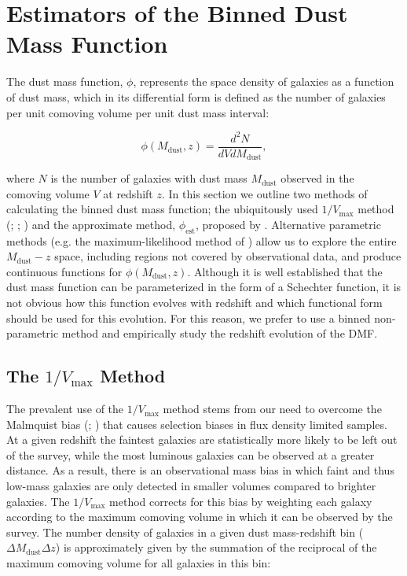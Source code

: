 \section{Estimators of the Binned Dust Mass Function}
\label{sec:dmf_estimators}

The dust mass function, $\phi$, represents the space density of galaxies as a function of dust mass, which in its differential form is defined as the number of galaxies per unit comoving volume per unit dust mass interval:

\begin{equation}
    \phi(M_{\textrm{dust}}, z) = \frac{d^2N}{dV dM_{\textrm{dust}}},
\label{eq:differential_phi}
\end{equation}

\noindent where $N$ is the number of galaxies with dust mass $M_{\textrm{dust}}$ observed in the comoving volume $V$ at redshift $z$. In this section we outline two methods of calculating the binned dust mass function; the ubiquitously used $1/V_{\textrm{max}}$ method (\citealt{Schmidt_1968}; \citealt{Felten_1976}; \citealt{Avni_1980}) and the approximate method, $\phi_{\textrm{est}}$, proposed by \citealt{Page_2000}. Alternative parametric methods (e.g. the maximum-likelihood method of \citealt{Marshall_1983}) allow us to explore the entire $M_{\textrm{dust}} - z$ space, including regions not covered by observational data, and produce continuous functions for $\phi(M_{\textrm{dust}}, z)$. Although it is well established that the dust mass function can be parameterized in the form of a Schechter function, it is not obvious how this function evolves with redshift and which functional form should be used for this evolution. For this reason, we prefer to use a binned non-parametric method and empirically study the redshift evolution of the DMF.

\subsection{The $1/V_{\textrm{max}}$ Method}

The prevalent use of the $1/V_{\textrm{max}}$ method stems from our need to overcome the Malmquist bias (\citealt{Eddington_1914}; \citealt{Malmquist_1922}) that causes selection biases in flux density limited samples. At a given redshift the faintest galaxies are statistically more likely to be left out of the survey, while the most luminous galaxies can be observed at a greater distance. As a result, there is an observational mass bias in which faint and thus low-mass galaxies are only detected in smaller volumes compared to brighter galaxies. The $1/V_{\textrm{max}}$ method corrects for this bias by weighting each galaxy according to the maximum comoving volume in which it can be observed by the survey. The number density of galaxies in a given dust mass-redshift bin ($\Delta M_{\textrm{dust}} \Delta z$) is approximately given by the summation of the reciprocal of the maximum comoving volume for all galaxies in this bin:

